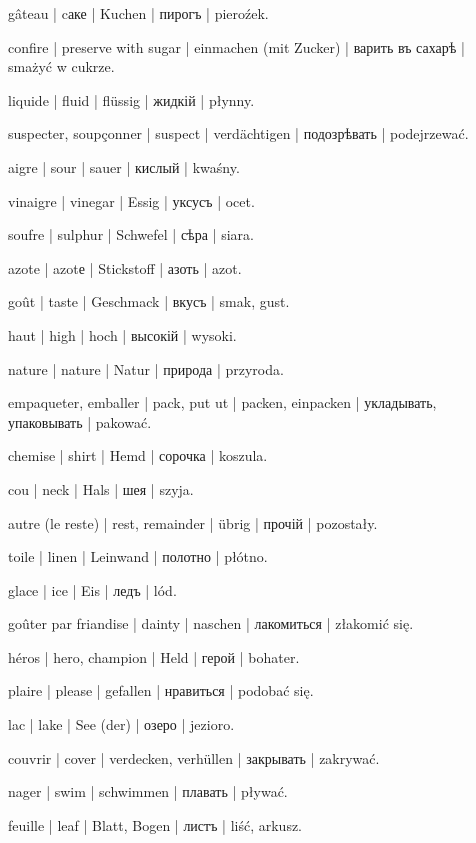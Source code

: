 \begin{ekzvocab}{1em}
 gâteau | cаке | Kuchen | пирогъ | pieroźek.

 confire | preserve with sugar | einmachen (mit Zucker) | варить въ сахарѣ | smażyć w cukrze.

 liquide | fluid | flüssig | жидкій | płynny.

 suspecter, soupçonner | suspect | verdächtigen | подозрѣвать | podejrzewać.

 aigre | sour | sauer | кислый | kwaśny.

 vinaigre | vinegar | Essig | уксусъ | ocet.

 soufre | sulphur | Schwefel | сѣра | siara.

 azote | azotе | Stickstoff | азоть | azot.

 goût | taste | Geschmack | вкусъ | smak, gust.

 haut | high | hoch | высокій | wysoki.

 nature | nature | Natur | природа | przyroda.

 empaqueter, emballer | pack, put ut | packen, einpacken | укладывать, упаковывать | pakować.

 chemise | shirt | Hemd | сорочка | koszula.

 cou | neck | Hals | шея | szyja.

 autre (le reste) | rest, remainder | übrig | прочій | pozostały.

 toile | linen | Leinwand | полотно | płótno.

 glace | ice | Eis | ледъ | lód.

 goûter par friandise | dainty | naschen | лакомиться | złakomić się.

 héros | hero, champion | Held | герой | bohater.

 plaire | please | gefallen | нравиться | podobać się.

 lac | lake | See (der) | озеро | jezioro.

 couvrir | cover | verdecken, verhüllen | закрывать | zakrywać.

\begin{minipage}{\textwidth}
 nager | swim | schwimmen | плавать | pływać.

 feuille | leaf | Blatt, Bogen | листъ | liść, arkusz.
\end{minipage}
\end{ekzvocab}

